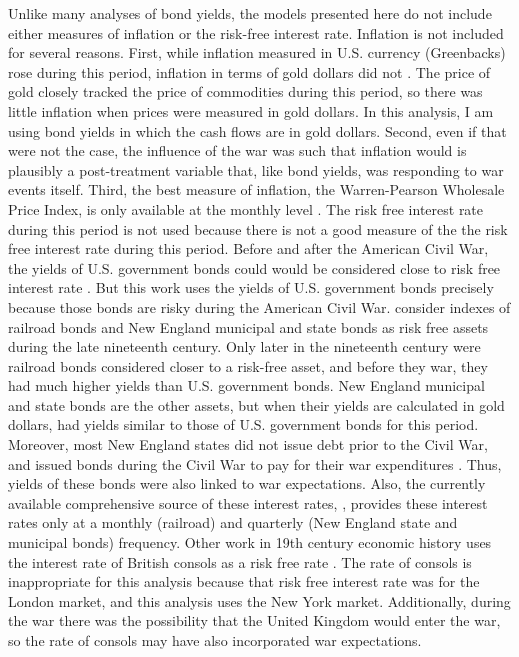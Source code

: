 Unlike many analyses of bond yields, the models presented here do not include either measures of inflation or the risk-free interest rate.
Inflation is not included for several reasons.
First, while inflation measured in U.S. currency (Greenbacks) rose during this period, inflation in terms of gold dollars did not \parencites{Mitchell1903}{Mitchell1908}.
The price of gold closely tracked the price of commodities during this period, so there was little inflation when prices were measured in gold dollars.
In this analysis, I am using bond yields in which the cash flows are in gold dollars.
Second, even if that were not the case, the influence of the war was such that inflation would is plausibly a post-treatment variable that, like bond yields, was responding to war events itself.
Third, the best measure of inflation, the Warren-Pearson Wholesale Price Index, is only available at the monthly level \parencite{WarrenPearson1933a}.
The risk free interest rate during this period is not used because there is not a good measure of the the risk free interest rate during this period.
Before and after the American Civil War, the yields of U.S. government bonds could would be considered close to risk free interest rate \parencites{HomerSylla2005}.
But this work uses the yields of U.S. government bonds precisely because those bonds are risky during the American Civil War.
\textcites{Macaulay1938}{HomerSylla2005} consider indexes of railroad bonds and New England municipal and state bonds as risk free assets during the late nineteenth century.
Only later in the nineteenth century were railroad bonds considered closer to a risk-free asset, and before they war, they had much higher yields than U.S. government bonds.
New England municipal and state bonds are the other assets, but when their yields are calculated in gold dollars, had yields similar to those of U.S. government bonds for this period.
Moreover, most New England states did not issue debt prior to the Civil War, and issued bonds during the Civil War to pay for their war expenditures \parencite[86--87]{Martin1871}.
Thus, yields of these bonds were also linked to war expectations.
Also, the currently available comprehensive source of these interest rates, \textcite{Macaulay1938}, provides these interest rates only at a monthly (railroad) and quarterly (New England state and municipal bonds) frequency.
Other work in 19th century economic history uses the interest rate of British consols as a risk free rate \parencite{BordoRockoff1996a}.
The rate of consols is inappropriate for this analysis because that risk free interest rate was for the London market, and this analysis uses the New York market.
Additionally, during the war there was the possibility that the United Kingdom would enter the war, so the rate of consols may have also incorporated war expectations.

